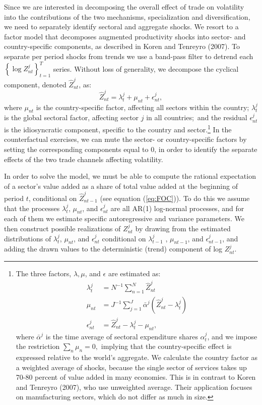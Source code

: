 \documentclass[12pt]{article}
\begin{document}
Since we are interested in decomposing the overall effect of trade on
volatility into the contributions of the two mechanisms, specialization and
diversification, we need to separately identify sectoral and aggregate
shocks. We resort to a factor model that decomposes augmented productivity
shocks into sector- and country-specific components, as described in Koren
and Tenreyro (2007). To separate per period shocks from trends we use a
band-pass filter to detrend each $\left\{ \log {Z_{nt}^{j}}\right\}
_{t=1}^{T}$ series. Without loss of generality, we decompose the cyclical
component, denoted $\hat{Z}_{nt}^{j}$, as: 
\begin{equation*}
\hat{Z}_{nt}^{j}=\lambda _{t}^{j}+\mu _{nt}+\epsilon _{nt}^{j},
\end{equation*}%
where ${\mu _{nt}}$ is the country-specific factor, affecting all sectors
within the country; $\lambda _{t}^{j}$ is the global sectoral factor,
affecting sector $j$ in all countries;\ and the residual $\epsilon _{nt}^{j}$
is the idiosyncratic component, specific to the country and sector.\footnote{%
The three factors, $\lambda ,\mu $, and $\epsilon $ are estimated as: 
\begin{align*}
\lambda _{t}^{j}& =N^{-1}\sum_{n=1}^{N}\hat{Z}_{nt}^{j} \\
\mu _{nt}& =J^{-1}\sum_{j=1}^{J}\bar{\alpha}^{j}\left( \hat{Z}%
_{nt}^{j}-\lambda _{t}^{j}\right) \\
\epsilon _{nt}^{j}& =\hat{Z}_{nt}^{j}-\lambda _{t}^{j}-\mu _{nt}\text{,}
\end{align*}%
where $\bar{\alpha}^{j}$ is the time average of sectoral expenditure shares $%
\alpha _{t}^{j}$, and we impose the restriction $\sum_{n}{\mu _{n}}=0,$
implying that the country-specific effect is expressed relative to the
world's aggregate. We calculate the country factor as a weighted average of
shocks, because the single sector of services takes up 70-80 percent of
value added in many economies. This is in contrast to Koren and Tenreyro
(2007), who use unweighted average. Their application focuses on
manufacturing sectors, which do not differ as much in size.} In the
counterfactual exercises, we can mute the sector- or country-specific
factors by setting the corresponding components equal to 0, in order to
identify the separate effects of the two trade channels affecting volatility.

In order to solve the model, we must be able to compute the rational
expectation of a sector's value added as a share of total value added at the
beginning of period $t$, conditional on $\hat{Z}_{nt-1}^{j}$%
 (see equation (\ref{eq:FOC})). To do this we assume that the
processes $\lambda _{t}^{j}$, $\mu _{nt}$, and $\epsilon
_{nt}^{j}$ are all AR(1) log-normal processes, and for each of them
we estimate specific autoregressive and variance parameters. We then
construct possible realizations of $Z_{nt}^{j}$ by drawing
from the estimated distributions of $\lambda _{t}^{j}$, $\mu _{nt}$,
and $\epsilon _{nt}^{j}$ conditional on $\lambda _{t-1}^{j}$%
, $\mu _{nt-1}$, and $\epsilon _{nt-1}^{j}$, and
adding the drawn values to the deterministic (trend) component of log $%
Z_{nt}^{j}$.
\end{document}

